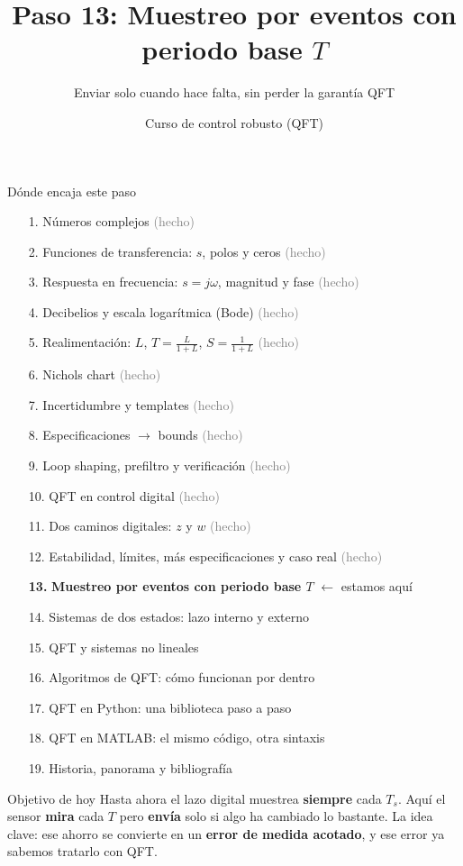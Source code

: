 \documentclass[aspectratio=169,11pt]{beamer}
\title[Muestreo por eventos]{Paso 13: Muestreo por eventos con periodo base $T$}
\subtitle{Enviar solo cuando hace falta, sin perder la garantía QFT}
\author{Curso de control robusto (QFT)}
\date{}
\begin{document}
\begin{frame}\titlepage\end{frame}

\begin{frame}{Dónde encaja este paso}
  \tiny
  \begin{enumerate}\setlength{\itemsep}{-2pt}
    \item[1.] Números complejos \hfill \textcolor{gray}{(hecho)}
    \item[2.] Funciones de transferencia: $s$, polos y ceros \hfill \textcolor{gray}{(hecho)}
    \item[3.] Respuesta en frecuencia: $s=j\omega$, magnitud y fase \hfill \textcolor{gray}{(hecho)}
    \item[4.] Decibelios y escala logarítmica (Bode) \hfill \textcolor{gray}{(hecho)}
    \item[5.] Realimentación: $L$, $T=\frac{L}{1+L}$, $S=\frac{1}{1+L}$ \hfill \textcolor{gray}{(hecho)}
    \item[6.] Nichols chart \hfill \textcolor{gray}{(hecho)}
    \item[7.] Incertidumbre y templates \hfill \textcolor{gray}{(hecho)}
    \item[8.] Especificaciones $\rightarrow$ bounds \hfill \textcolor{gray}{(hecho)}
    \item[9.] Loop shaping, prefiltro y verificación \hfill \textcolor{gray}{(hecho)}
    \item[10.] QFT en control digital \hfill \textcolor{gray}{(hecho)}
    \item[11.] Dos caminos digitales: $z$ y $w$ \hfill \textcolor{gray}{(hecho)}
    \item[12.] Estabilidad, límites, más especificaciones y caso real \hfill \textcolor{gray}{(hecho)}
    \item[\textbf{13.}] \textbf{Muestreo por eventos con periodo base $T$} \hfill $\leftarrow$ estamos aquí
    \item[14.] Sistemas de dos estados: lazo interno y externo
    \item[15.] QFT y sistemas no lineales
    \item[16.] Algoritmos de QFT: cómo funcionan por dentro
    \item[17.] QFT en Python: una biblioteca paso a paso
    \item[18.] QFT en MATLAB: el mismo código, otra sintaxis
    \item[19.] Historia, panorama y bibliografía
  \end{enumerate}
  \vspace{2pt}
  \begin{block}{Objetivo de hoy}
    Hasta ahora el lazo digital muestrea \textbf{siempre} cada $T_s$. Aquí el sensor \textbf{mira} cada $T$ pero \textbf{envía} solo si algo ha cambiado lo bastante. La idea clave: ese ahorro se convierte en un \textbf{error de medida acotado}, y ese error ya sabemos tratarlo con QFT.
  \end{block}
\end{frame}
\end{document}
